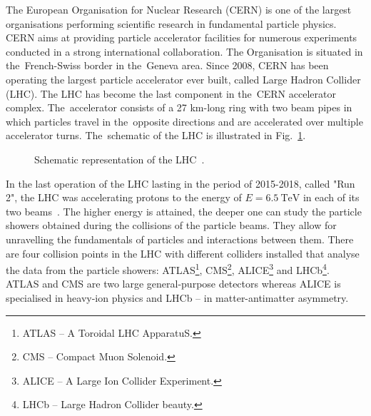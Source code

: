 
The European Organisation for Nuclear Research (CERN) is one of the largest organisations performing scientific research in fundamental particle physics. CERN aims at providing particle accelerator facilities for numerous experiments conducted in a strong international collaboration. The Organisation is situated in the~French-Swiss border in the~Geneva area. Since 2008, CERN has been operating the largest particle accelerator ever built, called Large Hadron Collider (LHC). The LHC has become the last component in the~CERN accelerator complex. The~accelerator consists of a 27 km-long ring with two beam pipes in which particles travel in the~opposite directions and are accelerated over multiple accelerator turns. The~schematic of the LHC is illustrated in Fig.~\ref{fig:schematic_representation_lhc}.

\begin{figure}[H]
    \centering
    \caption{Schematic representation of the LHC~\cite{schematic_representation_lhc}.}
    \label{fig:schematic_representation_lhc}
\end{figure}

In the last operation of the LHC lasting in the period of 2015-2018, called "Run 2", the LHC was accelerating protons to the energy of $E=6.5~\text{TeV}$ in each of its two beams~\cite{cern_main_webpage}. The higher energy is attained, the deeper one can study the particle showers obtained during the collisions of the particle beams. They allow for unravelling the fundamentals of particles and interactions between them. There are four collision points in the LHC with different colliders installed that analyse the data from the particle showers: ATLAS\footnote{ATLAS -- A Toroidal LHC ApparatuS.}, CMS\footnote{CMS -- Compact Muon Solenoid.}, ALICE\footnote{ALICE -- A Large Ion Collider Experiment.} and LHCb\footnote{LHCb -- Large Hadron Collider beauty.}. ATLAS and CMS are two large general-purpose detectors whereas ALICE is specialised in heavy-ion physics and LHCb -- in matter-antimatter asymmetry.~\cite[p.~3-21]{evans_marvel_of_technology}


